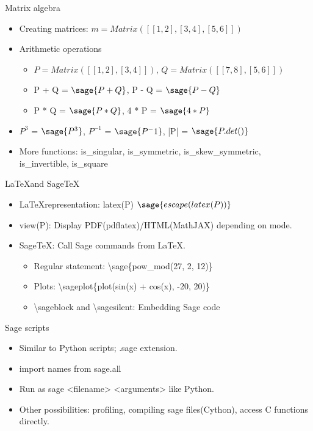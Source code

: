 \documentclass{beamer}
\begin{document}
\begin{frame}{Matrix algebra}
  \begin{itemize}
   \item Creating matrices: $m = Matrix([[1,2],[3,4],[5,6]])$
   \item Arithmetic operations
   \begin{itemize}
    \item $P = Matrix([[1, 2], [3, 4]])$, $Q = Matrix([[7, 8], [5, 6]])$
    \item P + Q = $\sage{P + Q}$, P - Q = $\sage{P - Q}$
    \item P * Q = $\sage{P * Q}$, 4 * P = $\sage{4 * P}$
   \end{itemize}
   \item $P^{3}$ = $\sage{P^3}$, $P^{-1}$ = $\sage{P^-1}$, |P| = $\sage{P.det()}$
   \item More functions: is\_singular, is\_symmetric, is\_skew\_symmetric, is\_invertible, is\_square
  \end{itemize}
\end{frame}

\begin{frame}{\LaTeX and Sage\TeX}
 \begin{itemize}
   \item \LaTeX representation: latex(P) $\sage{escape(latex(P))}$
   \item view(P): Display PDF(pdflatex)/HTML(MathJAX) depending on mode.
   \item Sage\TeX: Call Sage commands from \LaTeX.
   \begin{itemize}
    \item Regular statement: \textbackslash sage\{pow\_mod(27, 2, 12)\}
    \item Plots: \textbackslash sageplot\{plot(sin(x) + cos(x), -20, 20)\}
    \item \textbackslash sageblock and \textbackslash sagesilent: Embedding Sage code
   \end{itemize}
 \end{itemize}
\end{frame}

\begin{frame}{Sage scripts}
 \begin{itemize}
  \item Similar to Python scripts; .sage extension.
  \item import names from sage.all
  \item Run as sage <filename> <arguments> like Python.
  \item Other possibilities: profiling, compiling sage files(Cython), access C functions directly.
 \end{itemize}
\end{frame}
\end{document}
